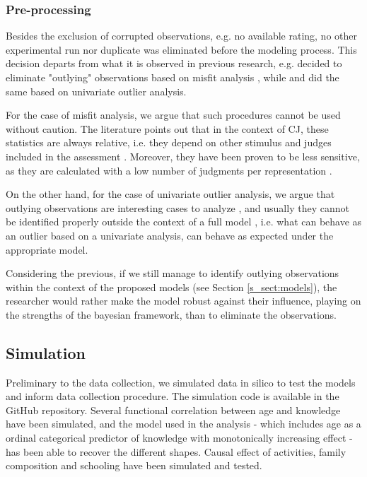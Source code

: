 \subsubsection{Pre-processing} \label{ss_sect:preproc}
%
Besides the exclusion of corrupted observations, e.g. no available rating, no other experimental run nor duplicate was eliminated before the modeling process. This decision departs from what it is observed in previous research, e.g. \citet{Boonen_et_al_2020} decided to eliminate "outlying" observations based on misfit analysis \citep{Lesterhuis_2018}, while \citet{vanDaal_2020} and \citet{Boonen_et_al_2021} did the same based on univariate outlier analysis. 

For the case of misfit analysis, we argue that such procedures cannot be used without caution. The literature points out that in the context of CJ, these statistics are always relative, i.e. they depend on other stimulus and judges included in the assessment \citep{Pollitt_2012a, Pollitt_2012b}. Moreover, they have been proven to be less sensitive, as they are calculated with a low number of judgments per representation \citep{Pollitt_2012a}. 

On the other hand, for the case of univariate outlier analysis, we argue that outlying observations are interesting cases to analyze \citep{McElreath_2020}, and usually they cannot be identified properly outside the context of a full model \citep{McElreath_2020}, i.e. what can behave as an outlier based on a univariate analysis, can behave as expected under the appropriate model. 

Considering the previous, if we still manage to identify outlying observations within the context of the proposed models (see Section \ref{s_sect:models}), the researcher would rather make the model robust against their influence, playing on the strengths of the bayesian framework, than to eliminate the observations. 
%
%
\subsection{Simulation}
Preliminary to the data collection, we simulated data in silico to test the models and inform data collection procedure. The simulation code is available in the GitHub repository. Several functional correlation between age and knowledge have been simulated, and the model used in the analysis - which includes age as a ordinal categorical predictor of knowledge with monotonically increasing effect - has been able to recover the different shapes. Causal effect of activities, family composition and schooling have been simulated and tested.

